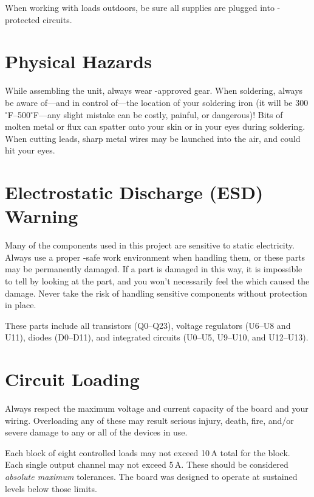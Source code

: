 \documentclass[letterpaper,twoside,onecolumn,openright,final]{memoir}
\begin{document}
When working with loads outdoors, be sure all supplies are plugged into -protected
circuits.

\section{Physical Hazards}
While assembling the unit, always wear -approved  gear.  When soldering,
always be aware of---and in control of---the location of your soldering iron (it will be 300$^\circ$F--500$^\circ$F---any slight 
mistake can be costly, painful, or dangerous)! Bits of molten metal or flux can spatter onto your
skin or in your eyes during soldering.  When cutting leads, sharp metal wires may be launched into the
air, and could hit your eyes.

\section{Electrostatic Discharge (ESD) Warning}
Many of the components used in this project are sensitive to static electricity.  Always use a proper
-safe work environment when handling them, or these parts may be permanently damaged.  If
a part is damaged in this way, 
it is impossible to tell by looking at the part, and you won't necessarily
feel the  which caused the damage.  Never take the risk of handling sensitive components
without  protection in place.

These parts include all transistors (Q0--Q23), voltage regulators (U6--U8 and U11), diodes (D0--D11),
and integrated circuits (U0--U5, U9--U10, and U12--U13).

\section{Circuit Loading}
Always respect the maximum voltage and current capacity of the board and your wiring.  Overloading any
of these may result serious injury, death, fire, and/or severe damage to any or all of the devices in use.

Each block of eight controlled loads may not exceed 
10\,A total for the block.  
Each single output channel
may not exceed 5\,A.  These should be considered \emph{absolute maximum} tolerances.  The board was designed
to operate at sustained levels below those limits.
\end{document}
